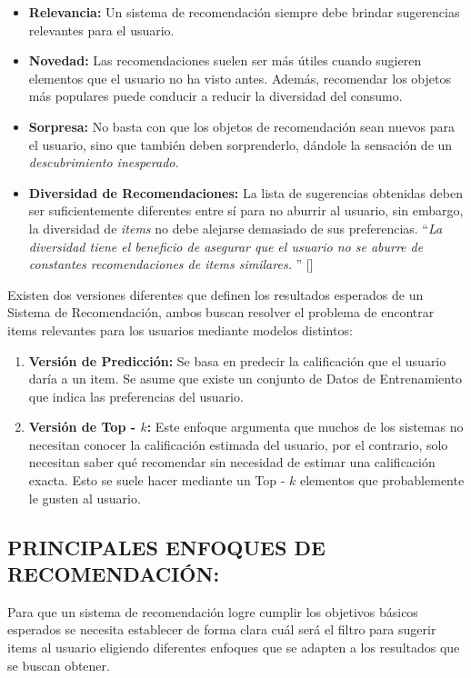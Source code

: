 \begin{itemize}
    \item \textbf{Relevancia: }Un sistema de recomendación siempre debe brindar sugerencias relevantes para el usuario.
    \item \textbf{Novedad: }  Las recomendaciones suelen ser más útiles cuando sugieren elementos que el usuario no ha visto antes. Además, recomendar los objetos más populares puede conducir a reducir la diversidad del consumo.
    \item \textbf{Sorpresa: } No basta con que los objetos de recomendación sean nuevos para el usuario, sino que también deben sorprenderlo, dándole la sensación de un \textit{descubrimiento inesperado.}
    
    \item \textbf{Diversidad de Recomendaciones: } La lista de sugerencias obtenidas deben ser suficientemente diferentes entre sí para no aburrir al usuario, sin embargo, la diversidad de \textit{items} no debe alejarse demasiado de sus preferencias.
   \enquote{\textit{La diversidad tiene el beneficio de asegurar que el usuario no se aburre de constantes recomendaciones de items similares. }} [\cite{Aggarwal2016}]
\end{itemize}

Existen dos versiones diferentes que definen los resultados esperados de un Sistema de Recomendación, ambos buscan resolver el problema de encontrar items relevantes para los usuarios mediante modelos distintos:


\begin{enumerate}
    \item \textbf{Versión de Predicción: } Se basa en predecir la calificación que el usuario daría a un item. Se asume que existe un conjunto de Datos de Entrenamiento que indica las preferencias del usuario.
    \item \textbf{Versión de Top - $k$: } Este enfoque argumenta que muchos de los sistemas no necesitan conocer la calificación estimada del usuario, por el contrario, solo necesitan saber qué recomendar sin necesidad de estimar una calificación exacta. Esto se suele hacer mediante un Top - $k$ elementos que probablemente le gusten al usuario.
\end{enumerate}

\newpage
\thispagestyle{plain}
\vspace*{0.2cm}

\subsection{PRINCIPALES ENFOQUES DE RECOMENDACIÓN: }
Para que un sistema de recomendación logre cumplir los objetivos básicos esperados se necesita establecer de forma clara cuál será el filtro para sugerir items al usuario eligiendo diferentes enfoques que se adapten a los resultados que se buscan obtener.

